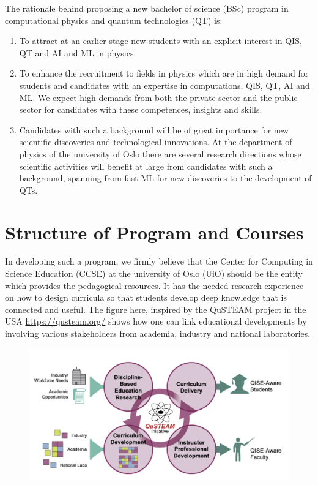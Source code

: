 \documentclass[aps,rmp,preprint,amsmath,amssymb,graphicx,longbibliography]{revtex4-1}
\begin{document}
The rationale behind proposing a new bachelor of science (BSc) program in computational physics and quantum technologies (QT) is:
\begin{enumerate}
    \item To attract at an earlier stage new students with an explicit interest in QIS, QT and AI and ML in physics. 
    \item To enhance the recruitment to fields in physics which are in high demand for students and candidates with an expertise in computations, QIS, QT, AI and ML. We expect high demands from both the private sector and the public sector for candidates with these competences, insights and skills.
    \item Candidates with such a background will be of great importance for new scientific discoveries and technological innovations. At the department of physics of the university of Oslo there are several research directions whose scientific activities will benefit at large from candidates with such a background, spanning from fast ML for new discoveries to the development of QTs.   
\end{enumerate}


\section{Structure of Program and Courses}

In developing such a program, we firmly believe that 
the Center for Computing in Science Education (CCSE) at the university of Oslo (UiO) should be the entity which provides the pedagogical resources. It has the needed research experience
on how to design curricula so that students develop deep knowledge that is connected and useful.
The figure here, inspired by the QuSTEAM project in the USA \url{https://qusteam.org/}
shows how one can link educational developments by involving various stakeholders from academia, industry and national laboratories. 
\begin{figure}[!htb]
\includegraphics[width=1.0\linewidth]{qusteam.png}
\end{figure}
\end{document}
